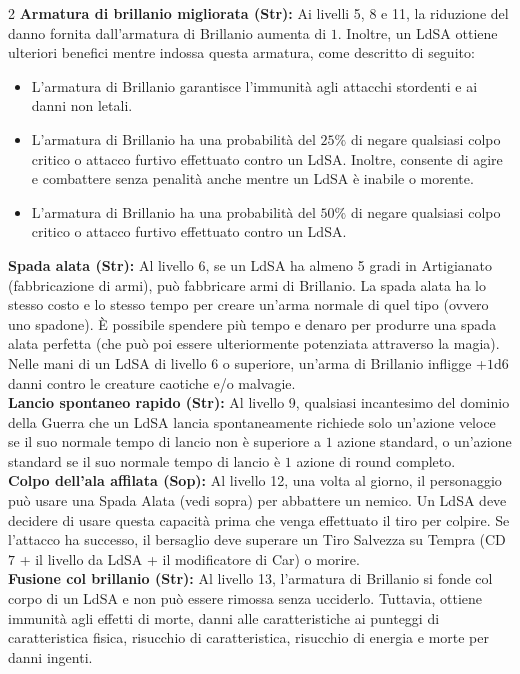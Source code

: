 \documentclass[10pt, a4paper]{report}
\begin{document}
\begin{multicols}{2}
\textbf{Armatura di brillanio migliorata (Str):}  Ai livelli 5, 8 e 11, la riduzione del danno fornita dall’armatura di Brillanio aumenta di $1$. Inoltre, un LdSA ottiene ulteriori benefici mentre indossa questa armatura, come descritto di seguito:
\begin{itemize}
	\item L’armatura di Brillanio garantisce l'immunità agli attacchi stordenti e ai danni non letali.
	\item L’armatura di Brillanio ha una probabilità del $25\%$ di negare qualsiasi colpo critico o attacco furtivo effettuato contro un LdSA. Inoltre, consente di agire e combattere senza penalità anche mentre un LdSA è inabile o morente.
	\item L’armatura di Brillanio ha una probabilità del $50\%$ di negare qualsiasi colpo critico o attacco furtivo effettuato contro un LdSA.
\end{itemize}

\textbf{Spada alata (Str):} Al livello 6, se un LdSA ha almeno 5 gradi in Artigianato (fabbricazione di armi), può fabbricare armi di Brillanio. La spada alata ha lo stesso costo e lo stesso tempo per creare un'arma normale di quel tipo (ovvero uno spadone). È possibile spendere più tempo e denaro per produrre una spada alata perfetta (che può poi essere ulteriormente potenziata attraverso la magia). Nelle mani di un LdSA di livello 6 o superiore, un'arma di Brillanio infligge +$1$d$6$ danni contro le creature caotiche e/o malvagie.\\

\textbf{Lancio spontaneo rapido (Str):} Al livello 9, qualsiasi incantesimo del dominio della Guerra che un LdSA lancia spontaneamente richiede solo un'azione veloce se il suo normale tempo di lancio non è superiore a $1$ azione standard, o un'azione standard se il suo normale tempo di lancio è $1$ azione di round completo.\\

\textbf{Colpo dell'ala affilata (Sop):} Al livello 12, una volta al giorno, il personaggio può usare una Spada Alata (vedi sopra) per abbattere un nemico. Un LdSA deve decidere di usare questa capacità prima che venga effettuato il tiro per colpire. Se l'attacco ha successo, il bersaglio deve superare un Tiro Salvezza su Tempra (CD $7$ + il livello da LdSA + il modificatore di Car) o morire.\\

\textbf{Fusione col brillanio (Str):} Al livello 13, l’armatura di Brillanio si fonde col corpo di un LdSA e non può essere rimossa senza ucciderlo. Tuttavia, ottiene immunità agli effetti di morte, danni alle caratteristiche ai punteggi di caratteristica fisica, risucchio di caratteristica, risucchio di energia e morte per danni ingenti.
\end{multicols}
\end{document}
